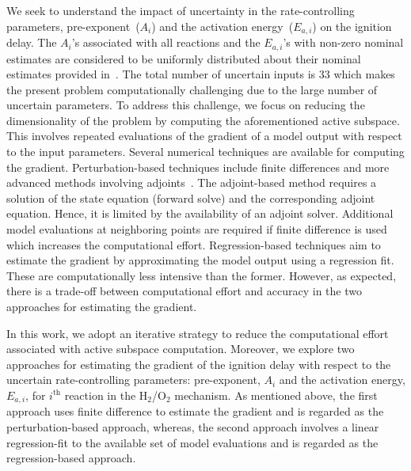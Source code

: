 We seek to understand the impact of uncertainty in the
rate-controlling parameters, pre-exponent~($A_i$) and the activation
energy~($E_{a,i}$) on the ignition delay. The $A_i$'s associated with all
reactions and the $E_{a,i}$'s with non-zero nominal estimates
are considered to be uniformly distributed about their nominal estimates provided
in~\cite{Yetter:1991}.  The total number of uncertain inputs is 33 which makes
the present problem computationally challenging due to the large number of 
uncertain parameters.  
To address this challenge, we focus on reducing the dimensionality
of the problem by computing the aforementioned active subspace.
This involves repeated evaluations of the gradient of a model output with
respect to the input parameters. Several numerical techniques are available
for computing the gradient. Perturbation-based techniques
include finite differences and more advanced methods involving
adjoints~\cite{Jameson:1988,Borzi:2011,Alexanderian:2017}. The
adjoint-based method requires a solution of the state equation (forward solve)
and the corresponding adjoint equation. Hence, it is 
limited by the availability of an adjoint solver. Additional model evaluations
at neighboring points are required if finite difference is used which increases
the computational effort. Regression-based techniques aim to estimate the
gradient by approximating the model output using a regression fit. These
are computationally less intensive than the former. However, as expected,
there is a trade-off between computational effort and accuracy in the two
approaches for estimating the gradient. 

In this work, we adopt an iterative strategy to reduce the computational effort
associated with active subspace computation. Moreover, we explore two approaches
for estimating the gradient of the ignition delay with respect to the uncertain
rate-controlling parameters: pre-exponent, $A_i$ and the activation energy, $E_{a,i}$,
for $i^{\text{th}}$ reaction in the H$_2$/O$_2$ mechanism. As mentioned above, the
first approach uses finite difference to estimate the gradient and is regarded as
the perturbation-based approach, whereas, the second approach involves a linear
regression-fit to the available set of model evaluations and is regarded as
the regression-based approach. 

